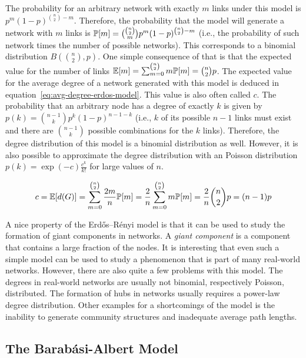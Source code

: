 The probability for an arbitrary network with exactly \(m\) links under this model is \(p^{m} (1-p)^{\binom{n}{2} - m}\).
Therefore, the probability that the model will generate a network with \(m\) links is \(\mathbb{P}[{m}] = \binom{\binom{n}{2}}{m} p^{m} (1-p)^{\binom{n}{2} - m}\) (i.e., the probability of such network times the number of possible networks).
This corresponds to  a binomial distribution \(B(\binom{n}{2}, p)\).
One simple consequence of that is that the expected value for the number of links \(\mathbb{E}[{m}] = \sum_{m=0}^{\binom{n}{2}} m \mathbb{P}[{m}] = \binom{n}{2} p\).
The expected value for the average degree of a network generated with this model is deduced in equation~\ref{eq:avg-degree-erdos-model}.
This value is also often called \(c\).
The probability that an arbitrary node has a degree of exactly \(k\) is given by \(p(k) = \binom{n-1}{k} p^{k} (1-p)^{n-1-k}\) (i.e., \(k\) of its possible \(n-1\) links must exist and there are \(\binom{n-1}{k}\) possible combinations for the \(k\) links).
Therefore, the degree distribution of this model is a binomial distribution as well.
However, it is also possible to approximate the degree distribution with an Poisson distribution \(p(k) = \exp(-c) \frac{c^{k}}{k!}\) for large values of \(n\).

\begin{equation}
  c = \mathbb{E}[{d(G)}] = \sum_{m=0}^{\binom{n}{2}} \frac{2m}{n} \mathbb{P}[{m}] = \frac{2}{n} \sum_{m=0}^{\binom{n}{2}} m \mathbb{P}[{m}] = \frac{2}{n} \binom{n}{2} p = (n-1) p
  \label{eq:avg-degree-erdos-model}
\end{equation}

A nice property of the Erdős–Rényi model is that it can be used to study the formation of giant components in networks.
A \emph{giant component} is a component that contains a large fraction of the nodes.
It is interesting that even such a simple model can be used to study a phenomenon that is part of many real-world networks.
However, there are also quite a few problems with this model.
The degrees in real-world networks are usually not binomial, respectively Poisson, distributed.
The formation of hubs in networks usually requires a power-law degree distribution.
Other examples for a shortcomings of the model is the inability to generate community structures and inadequate average path lengths.


\subsection{The Barabási-Albert Model}

